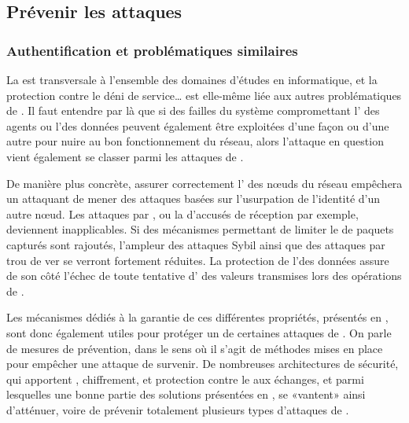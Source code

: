 \subsection{Prévenir les attaques}

    \subsubsection{Authentification et problématiques similaires}
    La \secu est transversale à l'ensemble des domaines d'études en informatique, et la protection contre le déni de service… est elle-même liée aux autres problématiques de \secu.
Il faut entendre par là que si des failles du système compromettant l' des agents ou l'\integrite des données peuvent également être exploitées d'une façon ou d'une autre pour nuire au bon fonctionnement du réseau, alors l'attaque en question vient également se classer parmi les attaques de \dds.

De manière plus concrète, assurer correctement l' des nœuds du réseau empêchera un attaquant de mener des attaques basées sur l'usurpation de l'identité d'un autre nœud.
Les attaques par \desync, ou la  d'accusés de réception par exemple, deviennent inapplicables.
Si des mécanismes permettant de limiter le  de paquets capturés sont rajoutés, l'ampleur des attaques Sybil ainsi que des attaques par trou de ver se verront fortement réduites.
La protection de l'\integrite des données assure de son côté l'échec de toute tentative d' des valeurs transmises lors des opérations de .

Les mécanismes dédiés à la garantie de ces différentes propriétés, présentés en , sont donc également utiles pour protéger un \rc de certaines attaques de \dds.
On parle de mesures de prévention, dans le sens où il s'agit de méthodes mises en place pour empêcher une attaque de survenir.
De nombreuses architectures de sécurité, qui apportent , chiffrement, \integrite et protection contre le  aux échanges, et parmi lesquelles une bonne partie des solutions présentées en , se «vantent» ainsi d'atténuer, voire de prévenir totalement plusieurs types d'attaques de \dds.

\pagebreak %
